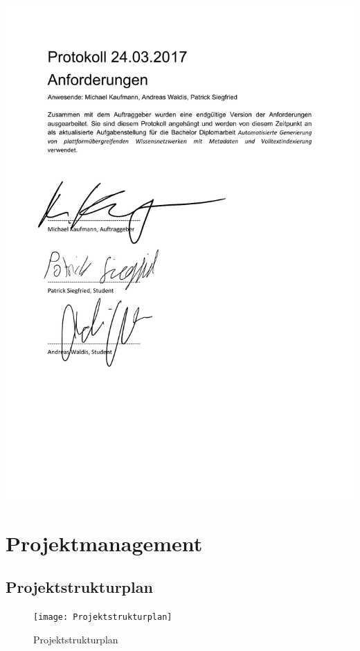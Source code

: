 \includegraphics[page=4,scale=0.8]{kapitel/anforderungen.pdf}

\section{Projektmanagement}

\newpage

\subsection{Projektstrukturplan}
\begin{landscape}
\begin{figure}[ht]
\centering
\texttt{[image: Projektstrukturplan]}
\caption{Projektstrukturplan}
\label{fig:projektstrukturplan}
\end{figure}
\end{landscape}

